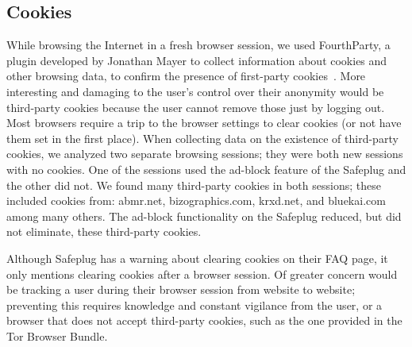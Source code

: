 \documentclass[letterpaper,twocolumn,10pt]{article}
\begin{document}

\subsection{Cookies}  
While browsing the Internet in a fresh browser session, we used FourthParty, a plugin developed by Jonathan Mayer to collect information about cookies and other browsing data, to confirm the presence of first-party cookies~\cite{fourthparty, mayer2012third}.  More interesting and damaging to the user's control over their anonymity would be third-party cookies because the user cannot remove those just by logging out.  Most browsers require a trip to the browser settings to clear cookies (or not have them set in the first place).  When collecting data on the existence of third-party cookies, we analyzed two separate browsing sessions; they were both new sessions with no cookies.  One of the sessions used the ad-block feature of the Safeplug and the other did not.  We found many third-party cookies in both sessions; these included cookies from: abmr.net, bizographics.com, krxd.net, and bluekai.com among many others.  The ad-block functionality on the Safeplug reduced, but did not eliminate, these third-party cookies.

Although Safeplug has a warning about clearing cookies on their FAQ page, it only mentions clearing cookies after a browser session.  Of greater concern would be tracking a user during their browser session from website to website; preventing this requires knowledge and constant vigilance from the user, or a browser that does not accept third-party cookies, such as the one provided in the Tor Browser Bundle.
\end{document}
